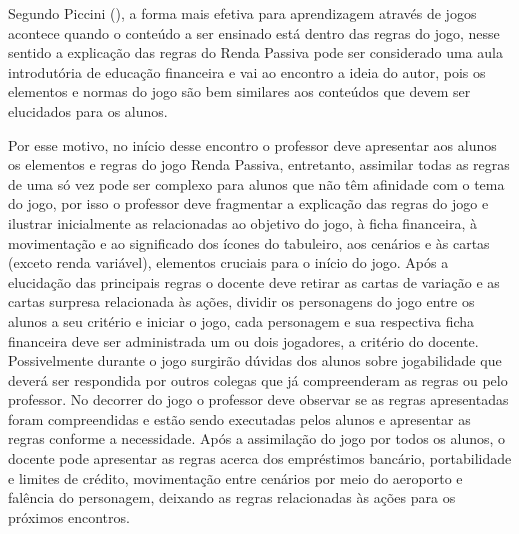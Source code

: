Segundo Piccini (\citeyear{piccini2008}), a forma mais efetiva para aprendizagem através de jogos acontece quando o conteúdo a ser ensinado está dentro das regras do jogo, nesse sentido a explicação das regras do Renda Passiva pode ser considerado uma aula introdutória de educação financeira e vai ao encontro a ideia do autor, pois os elementos e normas do jogo são bem similares aos conteúdos que devem ser elucidados para os alunos.

Por esse motivo, no início desse encontro o professor deve apresentar aos alunos os elementos e regras do jogo Renda Passiva, entretanto, assimilar todas as regras de uma só vez pode ser complexo para alunos que não têm afinidade com o tema do jogo, por isso o professor deve fragmentar a explicação das regras do jogo e ilustrar inicialmente as relacionadas ao objetivo do jogo, à ficha financeira, à movimentação e ao significado dos ícones do tabuleiro, aos cenários e às cartas (exceto renda variável), elementos cruciais para o início do jogo. Após a elucidação das principais regras o docente deve retirar as cartas de variação e as cartas surpresa relacionada às ações, dividir os personagens do jogo entre os alunos a seu critério e iniciar o jogo, cada personagem e sua respectiva ficha financeira deve ser administrada um ou dois jogadores, a critério do docente. Possivelmente durante o jogo surgirão dúvidas dos alunos sobre jogabilidade que deverá ser respondida por outros colegas que já compreenderam as regras ou pelo professor. No decorrer do jogo o professor deve observar se as regras apresentadas foram compreendidas e estão sendo executadas pelos alunos e apresentar as regras conforme a necessidade. Após a assimilação do jogo por todos os alunos, o docente pode apresentar as regras acerca dos empréstimos bancário, portabilidade e limites de crédito, movimentação entre cenários por meio do aeroporto e falência do personagem, deixando as regras relacionadas às ações para os próximos encontros.

